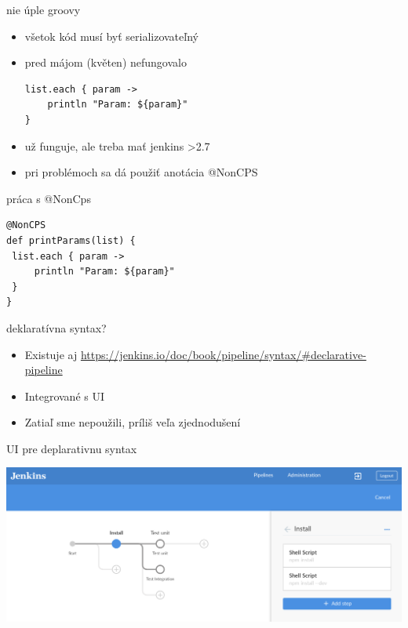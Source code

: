\documentclass[bigger]{beamer}
\begin{document}
\begin{frame}[fragile,label={sec:org9369b59}]{nie úple groovy}
 \begin{itemize}
\item všetok kód musí byť serializovateľný
\item pred májom (květen) nefungovalo
\begin{verbatim}
list.each { param ->
    println "Param: ${param}"
}
\end{verbatim}
\item už funguje, ale treba mať jenkins >2.7
\item pri problémoch sa dá použiť anotácia @NonCPS
\end{itemize}
\end{frame}
\begin{frame}[fragile,label={sec:org0aedfd9}]{práca s @NonCps}
 \begin{verbatim}
@NonCPS
def printParams(list) {
 list.each { param ->
     println "Param: ${param}"
 }
}
\end{verbatim}
\end{frame}

\begin{frame}[label={sec:org935eae4}]{deklaratívna syntax?}
\begin{itemize}
\item Existuje aj \url{https://jenkins.io/doc/book/pipeline/syntax/\#declarative-pipeline}
\item Integrované s UI
\item Zatiaľ sme nepoužili, príliš veľa zjednodušení
\end{itemize}
\end{frame}

\begin{frame}[label={sec:org00fc8c5}]{UI pre deplarativnu syntax}
\begin{center}
\includegraphics[width=.9\linewidth]{./023pipeline_editor.png}
\end{center}
\end{frame}
\end{document}

